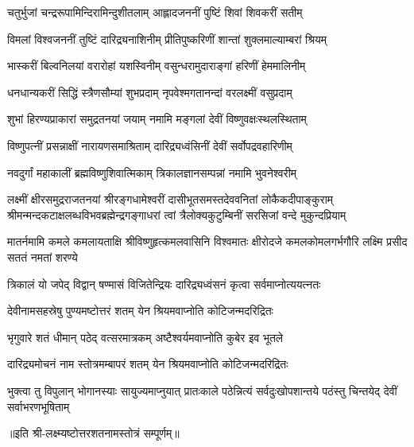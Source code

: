 \twolineshloka
{चतुर्भुजां चन्द्ररूपामिन्दिरामिन्दुशीतलाम्}
{आह्लादजननीं पुष्टिं शिवां शिवकरीं सतीम्}

\twolineshloka
{विमलां विश्वजननीं तुष्टिं दारिद्र्यनाशिनीम्}
{प्रीतिपुष्करिणीं शान्तां शुक्लमाल्याम्बरां श्रियम्}

\twolineshloka
{भास्करीं बिल्वनिलयां वरारोहां यशस्विनीम्}
{वसुन्धरामुदाराङ्गां हरिणीं हेममालिनीम्}

\twolineshloka
{धनधान्यकरीं सिद्धिं स्त्रैणसौम्यां शुभप्रदाम्}
{नृपवेश्मगतानन्दां वरलक्ष्मीं वसुप्रदाम्}

\twolineshloka
{शुभां हिरण्यप्राकारां समुद्रतनयां जयाम्}
{नमामि मङ्गलां देवीं विष्णुवक्षःस्थलस्थिताम्}

\twolineshloka
{विष्णुपत्नीं प्रसन्नाक्षीं नारायणसमाश्रिताम्}
{दारिद्र्यध्वंसिनीं देवीं सर्वोपद्रवहारिणीम्}

\twolineshloka
{नवदुर्गां महाकालीं ब्रह्मविष्णुशिवात्मिकाम्}
{त्रिकालज्ञानसम्पन्नां नमामि भुवनेश्वरीम्}

\fourlineindentedshloka
{लक्ष्मीं क्षीरसमुद्रराजतनयां श्रीरङ्गधामेश्वरीं}
{दासीभूतसमस्तदेववनितां लोकैकदीपाङ्कुराम्}
{श्रीमन्मन्दकटाक्षलब्धविभवब्रह्मेन्द्रगङ्गाधरां}
{त्वां त्रैलोक्यकुटुम्बिनीं सरसिजां वन्दे मुकुन्दप्रियाम्}

\fourlineindentedshloka
{मातर्नमामि कमले कमलायताक्षि}
{श्रीविष्णुहृत्कमलवासिनि विश्वमातः}
{क्षीरोदजे कमलकोमलगर्भगौरि}
{लक्ष्मि प्रसीद सततं नमतां शरण्ये}

\twolineshloka
{त्रिकालं यो जपेद् विद्वान् षण्मासं विजितेन्द्रियः}
{दारिद्र्यध्वंसनं कृत्वा सर्वमाप्नोत्ययत्नतः}

\twolineshloka
{देवीनामसहस्रेषु पुण्यमष्टोत्तरं शतम्}
{येन श्रियमवाप्नोति कोटिजन्मदरिद्रितः}

\twolineshloka
{भृगुवारे शतं धीमान् पठेद् वत्सरमात्रकम्}
{अष्टैश्वर्यमवाप्नोति कुबेर इव भूतले}

\twolineshloka
{दारिद्र्यमोचनं नाम स्तोत्रमम्बापरं शतम्}
{येन श्रियमवाप्नोति कोटिजन्मदरिद्रितः}

\threelineshloka
{भुक्त्वा तु विपुलान् भोगानस्याः सायुज्यमाप्नुयात्}
{प्रातःकाले पठेन्नित्यं सर्वदुःखोपशान्तये}
{पठंस्तु चिन्तयेद् देवीं सर्वाभरणभूषिताम्}

॥इति श्री-लक्ष्म्यष्टोत्तरशतनामस्तोत्रं सम्पूर्णम्॥
